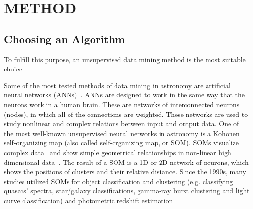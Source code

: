 
\section{METHOD}
\label{sec: method}
\subsection{Choosing an Algorithm}
To fulfill this purpose, an unsupervised data mining method is the most suitable choice.


Some of the most tested methods of data mining in astronomy are artificial neural networks (ANNs)~\citep[e.g.][and references therein]{ Hossein14,Hossein16}.
ANNs are designed to work in the same way that the neurons work in a human brain.
These are networks of interconnected neurons (nodes), in which all of the connections are weighted.
These networks are used to study nonlinear and complex relations between input and output data.
One of the most well-known unsupervised neural networks in astronomy is a Kohonen self-organizing map (also called self-organizing map, or SOM).
SOMs visualize complex data~\citep{Kohonen82} and show simple geometrical relationships in non-linear high dimensional data~\citep{Kohonen98}.
The result of a SOM is a 1D or 2D network of neurons, which shows the positions of clusters and their relative distance.
Since the 1990s, many studies utilized SOMs for object classification and clustering (e.g. classifying quasars' spectra, star/galaxy classifications, gamma-ray burst clustering and light curve classification) and photometric redshift estimation~\citep[e.g.][]{Odewahn92, Hernandez94, Murtagh95, Maehoenen95,Scaringi09,Geach12,Fustes13,Meusinger16,Rahmani16b} %

